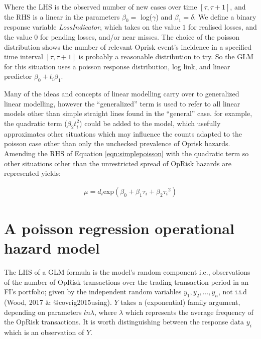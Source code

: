 \documentclass{DissertateUSU}
\begin{document}
Where the LHS is the observed number of new cases over time
\([\tau,\tau+1]\), and the RHS is a linear in the parameters
\(\beta_0 =\) \mbox{log}(\(\gamma\)) and \(\beta_1 = \delta\). We define
a binary response variable \emph{LossIndicator}, which takes on the
value \(1\) for realised losses, and the value \(0\) for pending losses,
and/or near misses. The choice of the poisson distribution shows the
number of relevant Oprisk event's incidence in a specified time interval
\([\tau,\tau+1]\) is probably a reasonable distribution to try. So the
GLM for this situation uses a poisson response distribution, log link,
and linear predictor \(\beta_0 + t_i\beta_1\).\medskip

Many of the ideas and concepts of linear modelling carry over to
generalized linear modelling, however the ``generalized'' term is used
to refer to all linear models other than simple straight lines found in
the ``general'' case. for example, the quadratic term (\(\beta_2t_i^2\))
could be added to the model, which usefully approximates other
situations which may influence the counts adapted to the poisson case
other than only the unchecked prevalence of Oprisk hazards. Amending the
RHS of Equation \ref{eqn:simplepoisson} with the quadratic term so other
situations other than the unrestricted spread of OpRisk hazards are
represented yields:

\singlespacing

\begin{eqnarray}\label{eqn:adaptedpoisson}
\mu = d_i\mbox{exp}(\beta_0 + \beta_1\tau_i + \beta_2{\tau_i}^2) 
\end{eqnarray} \doublespacing

\section{A poisson regression operational hazard model}
\label{sec:A poisson regression operational hazard model}

The LHS of a GLM formula is the model's random component i.e.,
observations of the number of OpRisk transactions over the trading
transaction period in an FI's portfolio; given by the independent random
variables \(y_1, y_2,\ldots, y_n\), not i.i.d (Wood, 2017 \&
@covrig2015using). \(Y\) takes a (exponential) family argument,
depending on parameters \(ln\lambda\), where \(\lambda\) which
represents the average frequency of the OpRisk transactions. It is worth
distinguishing between the response data \(y_i\) which is an observation
of \(Y\).\medskip
\end{document}

